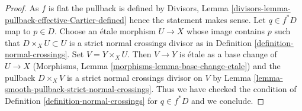 \documentclass[10pt,a4paper]{amsart}
\theoremstyle{plain}
\theoremstyle{definition}
\theoremstyle{remark}
\numberwithin{equation}{subsection}
\begin{document}
\begin{proof}
As $f$ is flat the pullback is defined by
Divisors, Lemma \ref{divisors-lemma-pullback-effective-Cartier-defined}
hence the statement makes sense.
Let $q \in f^*D$ map to $p \in D$.
Choose an \'etale morphism $U \to X$ whose image contains $p$
such that $D \times_X U \subset U$ is a strict normal crossings
divisor as in Definition \ref{definition-normal-crossings}.
Set $V = Y \times_X U$. Then $V \to Y$ is \'etale as a base
change of $U \to X$
(Morphisms, Lemma \ref{morphisms-lemma-base-change-etale})
and the pullback $D \times_X V$ is a strict normal crossings
divisor on $V$ by Lemma \ref{lemma-smooth-pullback-strict-normal-crossings}.
Thus we have checked the condition of
Definition \ref{definition-normal-crossings}
for $q \in f^*D$ and we conclude.
\end{proof}
\end{document}
